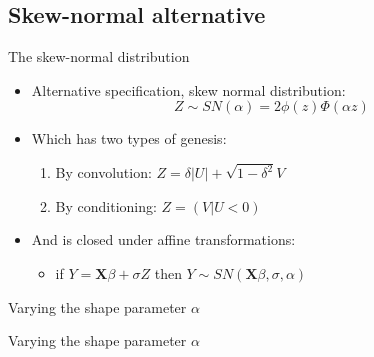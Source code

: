 \documentclass[ignorenonframetext]{beamer}
\begin{document}
\subsection{Skew-normal alternative}

\begin{frame}{The skew-normal distribution}
\begin{itemize}
	\item Alternative specification, skew normal distribution:
%
\begin{equation*}
Z \sim SN(\alpha) = 2\phi(z)\Phi(\alpha z)
\end{equation*}
%
\pause
\item Which has two types of genesis:
\begin{enumerate}
	\item By convolution: $Z = \delta|U| + \sqrt{1-\delta^2}V$
	\item By conditioning: $Z = (V|U<0)$
	\newline
\end{enumerate}
\pause
\item And is closed under affine transformations: 
\begin{itemize}
	\item if $Y = \mathbf{X}\beta + \sigma Z$ then $Y \sim SN(\mathbf{X}\beta,\sigma, \alpha)$
\end{itemize}
\end{itemize}

\end{frame}

\begin{frame}{Varying the shape parameter $\alpha$}
\begin{figure}[h]
	\center
{}
\label{fig:sn1}
\end{figure}
\end{frame}

\begin{frame}{Varying the shape parameter $\alpha$}
\begin{figure}[h]
	\center
{}
\label{fig:sn2}
\end{figure}
\end{frame}
\end{document}
